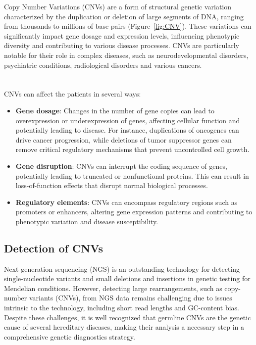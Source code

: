 \documentclass[a4paper,12pt,twoside]{ThesisStyle}
\begin{document}
Copy Number Variations (CNVs) are a form of structural genetic variation characterized by the duplication or deletion of large segments of DNA, ranging from thousands to millions of base pairs (Figure~\ref{fig:CNV}). These variations can significantly impact gene dosage and expression levels, influencing phenotypic diversity and contributing to various disease processes. CNVs are particularly notable for their role in complex diseases, such as neurodevelopmental disorders, psychiatric conditions, radiological disorders and various cancers.
\\\\\\
CNVs can affect the patients in several ways:
\begin{itemize}

    \item \textbf{Gene dosage}: Changes in the number of gene copies can lead to overexpression or underexpression of genes, affecting cellular function and potentially leading to disease. For instance, duplications of oncogenes can drive cancer progression, while deletions of tumor suppressor genes can remove critical regulatory mechanisms that prevent uncontrolled cell growth.
    \item \textbf{Gene disruption}: CNVs can interrupt the coding sequence of genes, potentially leading to truncated or nonfunctional proteins. This can result in loss-of-function effects that disrupt normal biological processes.
    \item \textbf{Regulatory elements}: CNVs can encompass regulatory regions such as promoters or enhancers, altering gene expression patterns and contributing to phenotypic variation and disease susceptibility.
\end{itemize}

\subsection{Detection of CNVs}
Next-generation sequencing (NGS) is an outstanding technology for detecting single-nucleotide variants and small deletions and insertions in genetic testing for Mendelian conditions. However, detecting large rearrangements, such as copy-number variants (CNVs), from NGS data remains challenging due to issues intrinsic to the technology, including short read lengths and GC-content bias. Despite these challenges, it is well recognized that germline CNVs are the genetic cause of several hereditary diseases, making their analysis a necessary step in a comprehensive genetic diagnostics strategy.
\end{document}
